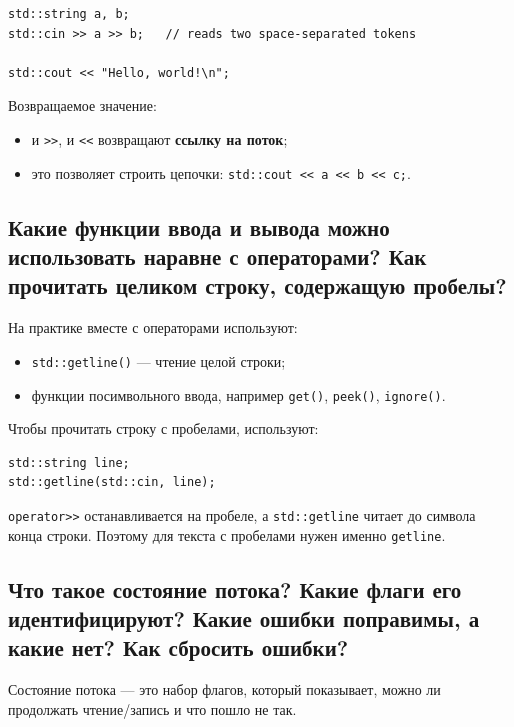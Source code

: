 \begin{example}
\begin{verbatim}
std::string a, b;
std::cin >> a >> b;   // reads two space-separated tokens

std::cout << "Hello, world!\n";
\end{verbatim}
\end{example}

Возвращаемое значение:
\begin{itemize}
    \item и \texttt{>>}, и \texttt{<<} возвращают \textbf{ссылку на поток};
    \item это позволяет строить цепочки: \texttt{std::cout << a << b << c;}.
\end{itemize}

\subsection{Какие функции ввода и вывода можно использовать наравне с операторами? Как прочитать целиком строку, содержащую пробелы?}
На практике вместе с операторами используют:
\begin{itemize}
    \item \texttt{std::getline()} — чтение целой строки;
    \item функции посимвольного ввода, например \texttt{get()}, \texttt{peek()}, \texttt{ignore()}.
\end{itemize}

Чтобы прочитать строку с пробелами, используют:
\begin{verbatim}
std::string line;
std::getline(std::cin, line);
\end{verbatim}

\begin{remark}
\texttt{operator>>} останавливается на пробеле, а \texttt{std::getline} читает до символа конца строки. Поэтому для текста с пробелами нужен именно \texttt{getline}.
\end{remark}

\subsection{Что такое состояние потока? Какие флаги его идентифицируют? Какие ошибки поправимы, а какие нет? Как сбросить ошибки?}
\begin{definition}
Состояние потока — это набор флагов, который показывает, можно ли продолжать чтение/запись и что пошло не так.
\end{definition}

